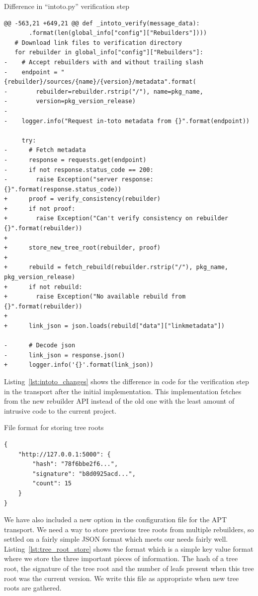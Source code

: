 \documentclass[../Main/thesis.tex]{subfiles}
\begin{document}
\begin{listing}[H]
\caption{Difference in ``intoto.py'' verification step}
\label{lst:intoto_changes}
\begin{verbatim}
@@ -563,21 +649,21 @@ def _intoto_verify(message_data):
       .format(len(global_info["config"]["Rebuilders"])))
   # Download link files to verification directory
   for rebuilder in global_info["config"]["Rebuilders"]:
-    # Accept rebuilders with and without trailing slash
-    endpoint = "{rebuilder}/sources/{name}/{version}/metadata".format(
-        rebuilder=rebuilder.rstrip("/"), name=pkg_name,
-        version=pkg_version_release)
-
-    logger.info("Request in-toto metadata from {}".format(endpoint))
 
     try:
-      # Fetch metadata
-      response = requests.get(endpoint)
-      if not response.status_code == 200:
-        raise Exception("server response: {}".format(response.status_code))
+      proof = verify_consistency(rebuilder)
+      if not proof:
+        raise Exception("Can't verify consistency on rebuilder {}".format(rebuilder))
+
+      store_new_tree_root(rebuilder, proof)
+
+      rebuild = fetch_rebuild(rebuilder.rstrip("/"), pkg_name, pkg_version_release)
+      if not rebuild:
+        raise Exception("No available rebuild from {}".format(rebuilder))
+
+      link_json = json.loads(rebuild["data"]["linkmetadata"])
 
-      # Decode json
-      link_json = response.json()
+      logger.info('{}'.format(link_json))
\end{verbatim}
\end{listing}

Listing~\ref{lst:intoto_changes} shows the difference in code for the
verification step in the transport after the initial implementation. This
implementation fetches from the new rebuilder API instead of the old one with
the least amount of intrusive code to the current project.

\begin{listing}[H]
\caption{File format for storing tree roots}
\label{lst:tree_root_store}
\begin{verbatim}
{
    "http://127.0.0.1:5000": {
        "hash": "78f6bbe2f6...",
        "signature": "b8d0925acd...",
        "count": 15
    }
}
\end{verbatim}
\end{listing}

We have also included a new option in the configuration file for the APT 
transport. We need a way to store previous tree roots from multiple rebuilders,
so settled on a fairly simple JSON format which meets our needs fairly well.
Listing~\ref{lst:tree_root_store} shows the format which is a simple key value
format where we store the three important pieces of information. The hash of a
tree root, the signature of the tree root and the number of leafs present when
this tree root was the current version. We write this file as appropriate when
new tree roots are gathered.
\end{document}
